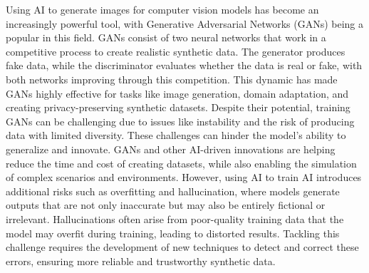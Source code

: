 Using AI to generate images for computer vision models has become an increasingly powerful tool, with Generative Adversarial Networks (GANs) being a popular in this field. GANs consist of two neural networks that work in a competitive process to create realistic synthetic data. The generator produces fake data, while the discriminator evaluates whether the data is real or fake, with both networks improving through this competition. This dynamic has made GANs highly effective for tasks like image generation, domain adaptation, and creating privacy-preserving synthetic datasets. Despite their potential, training GANs can be challenging due to issues like instability and the risk of producing data with limited diversity. These challenges can hinder the model’s ability to generalize and innovate. \cite{gan} GANs and other AI-driven innovations are helping reduce the time and cost of creating datasets, while also enabling the simulation of complex scenarios and environments. However, using AI to train AI introduces additional risks such as overfitting and hallucination, where models generate outputs that are not only inaccurate but may also be entirely fictional or irrelevant. Hallucinations often arise from poor-quality training data that the model may overfit during training, leading to distorted results. Tackling this challenge requires the development of new techniques to detect and correct these errors, ensuring more reliable and trustworthy synthetic data. \cite{hallucination}
